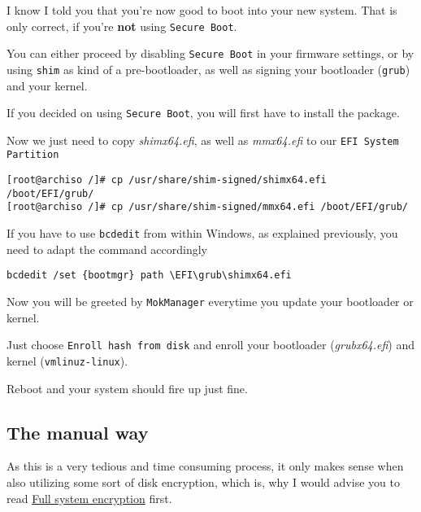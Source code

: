 \documentclass[9pt]{report}
\newenvironment{NOTE}
{\begin{tcolorbox}[colback=admonitionBG,coltitle=draculaFG,colframe=draculaBlue,colbacktitle=draculaBlue,title=NOTE]}
{\end{tcolorbox}}
\newenvironment{WARNING}
{\begin{tcolorbox}[colback=admonitionBG,coltitle=draculaBG,colframe=draculaOrange,colbacktitle=draculaOrange,title=WARNING]}
{\end{tcolorbox}}
\begin{document}
I know I told you that you’re now good to boot into your new system.
That is only correct, if you’re \textbf{not} using \texttt{Secure Boot}.


You can either proceed by disabling \texttt{Secure Boot} in your firmware settings, or by using \texttt{shim} as kind of a pre-bootloader, as well as signing your bootloader (\texttt{grub}) and your kernel.


If you decided on using \texttt{Secure Boot}, you will first have to install the package.


Now we just need to copy \textit{shimx64.efi}, as well as \textit{mmx64.efi} to our \texttt{EFI System Partition}


\begin{verbatim}
[root@archiso /]# cp /usr/share/shim-signed/shimx64.efi /boot/EFI/grub/
[root@archiso /]# cp /usr/share/shim-signed/mmx64.efi /boot/EFI/grub/
\end{verbatim}

\begin{NOTE}
    If you have to use \texttt{bcdedit} from within Windows, as explained previously, you need to adapt the command accordingly


    \begin{verbatim}
bcdedit /set {bootmgr} path \EFI\grub\shimx64.efi
    \end{verbatim}
\end{NOTE}

Now you will be greeted by \texttt{MokManager} everytime you update your bootloader or kernel.


Just choose \texttt{Enroll hash from disk} and enroll your bootloader (\textit{grubx64.efi}) and kernel (\texttt{vmlinuz-linux}).


Reboot and your system should fire up just fine.



\newpage

\hypertarget{x-the-manual-way}{\subsection{The manual way}}
\begin{WARNING}
    As this is a very tedious and time consuming process, it only makes sense when also utilizing some sort of disk encryption, which is, why I would advise you to read \hyperlink{x-full-system-encryption}{Full system encryption} first.

\end{WARNING}
\end{document}
